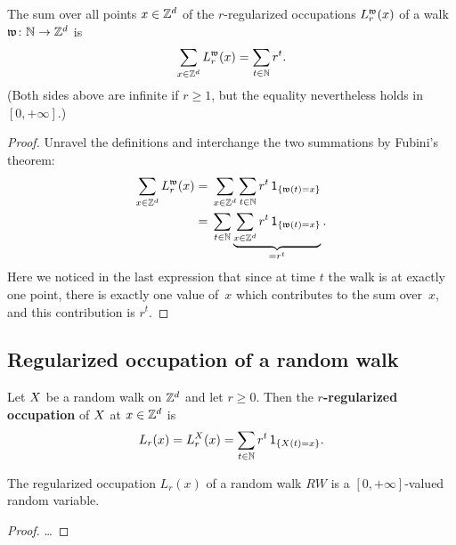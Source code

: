 \begin{lemma}
  \label{lem:sum_walk_regOcc_eq_geom_ser}
  The sum over all points $x \in \mathbb{Z}^d$ of the $r$-regularized
  occupations $L^{\mathfrak{w}}_r(x)$ of a walk $\mathfrak{w} \colon \mathbb{N} \to \mathbb{Z}^d$ is
  \begin{align*}
  \sum_{x \in \mathbb{Z}^d} L^{\mathfrak{w}}_r(x) = \sum_{t \in \mathbb{N}} r^t .
  \end{align*}
  (Both sides above are infinite if $r \ge 1$, but the equality
  nevertheless holds in $[0,+\infty]$.)
\end{lemma}
\begin{proof}
Unravel the definitions and interchange the two summations by Fubini's theorem:
\begin{align*}
\sum_{x \in \mathbb{Z}^d} L^{\mathfrak{w}}_r(x)
= & \; \sum_{x \in \mathbb{Z}^d} \sum_{t \in \mathbb{N}} r^t \, \mathsf{1}_{\left\{ \mathfrak{w}(t) = x \right\}} \\
= & \; \sum_{t \in \mathbb{N}} \underbrace{\sum_{x \in \mathbb{Z}^d} r^t \, \mathsf{1}_{\left\{ \mathfrak{w}(t) = x \right\}}}_{=r^t}.
\end{align*}
Here we noticed in the last expression that since at time $t$ the walk is
at exactly one point, there is exactly one value of~$x$ which contributes
to the sum over~$x$, and this contribution is $r^t$.
\end{proof}


\subsection*{Regularized occupation of a random walk}

\begin{definition}
  \label{def:regularized occupation}
  \leanok
  Let $X$ be a random walk on $\mathbb{Z}^d$ and let $r \ge 0$.
  Then the \textbf{$r$-regularized occupation}
  of $X$ at $x \in \mathbb{Z}^d$ is
  \begin{align}\label{eq: reg occupation}
  L_r(x) = L^{X}_r(x) = \sum_{t \in \mathbb{N}} r^t \, \mathsf{1}_{\left\{ X(t) = x \right\}} .
  \end{align}
\end{definition}

\begin{lemma}
  \label{lem:regularized occupation_mble}
  The regularized occupation $L_r(x)$ of a random walk $RW$
  is a $[0,+\infty]$-valued random variable.
\end{lemma}
\begin{proof}
\ldots
\end{proof}


